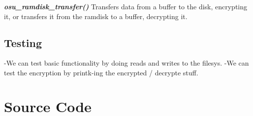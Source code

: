 \textbf{\emph{osu\_ramdisk\_transfer()}} Transfers data from a buffer to
the disk, encrypting it, or transfers it from the ramdisk to a buffer,
decrypting it.

\subsection{Testing}

-We can test basic functionality by doing reads and writes to the
filesys. -We can test the encryption by printk-ing the encrypted /
decrypte stuff.

\section{Source Code}
